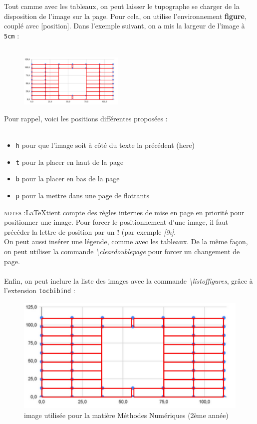 \documentclass[a4paper, 10pt]{book}
\begin{document}
Tout camme avec les tableaux, on peut laisser le tupographe se charger de la disposition de l'image sur la page. Pour cela, on utilise l'environnement \textbf{figure}, couplé avec [position]. Dans l'exemple suivant, on a mis la largeur de l'image à \texttt{5cm} : \\ \\

\begin{figure}[h]
\includegraphics[width=5cm]{grapheHV}
\end{figure}

Pour rappel, voici les positions différentes proposées : \\ \\

\begin{itemize}
\item \texttt{h} pour que l'image soit à côté du texte la précédent (here)
\item \texttt{t} pour la placer en haut de la page
\item \texttt{b} pour la placer en bas de la page
\item \texttt{p} pour la mettre dans une page de flottants
\end{itemize}

\textsc{notes :}\LaTeX tient compte des règles internes de mise en page en priorité pour positionner une image. Pour forcer le positionnement d'une image, il faut précéder la lettre de position par un \textbf{!} (par exemple \textit{[!h]}. \\ On peut aussi insérer une légende, comme avec les tableaux. De la même façon, on peut utiliser la commande \textit{\textbackslash cleardoublepage} pour forcer un changement de page.\\ \\
Enfin, on peut inclure la liste des images avec la commande \textit{\textbackslash listoffigures}, grâce à l'extension \texttt{tocbibind} :

\begin{figure}[h]
\caption{\label{Image1} image utilisée pour la matière Méthodes Numériques (2ème année)}
\includegraphics{grapheHV}
\end{figure}
\end{document}
